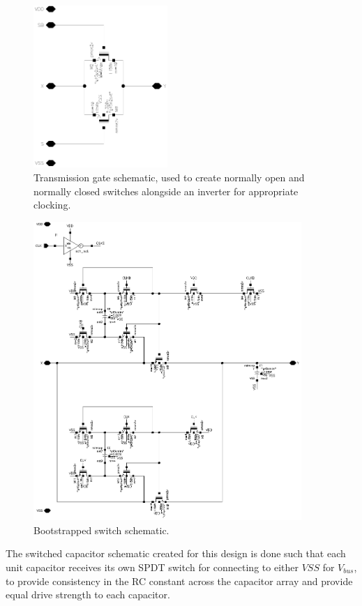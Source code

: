 \documentclass[11pt,letterpaper]{article}
\begin{document}
\begin{figure}[htbp!]
		\centering
		\includegraphics[width=2in]{images/sch_tg.eps}
		\caption{Transmission gate schematic, used to create normally open and normally closed switches alongside an inverter for appropriate clocking.}\label{fig:tg}
\end{figure}

\begin{figure}[htbp!]
		\centering
		\includegraphics[width=4in]{images/sch_bootsw.eps}
		\caption{Bootstrapped switch schematic.}\label{fig:boot}
\end{figure}

The switched capacitor schematic created for this design is done such that each unit capacitor receives its own SPDT switch for connecting to either \(VSS\) for \(V_{bus}\), to provide consistency in the RC constant across the capacitor array and provide equal drive strength to each capacitor.
\end{document}
